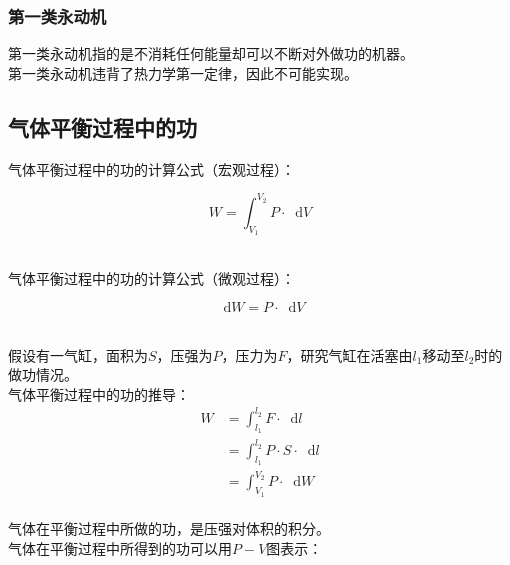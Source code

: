 \documentclass[UTF8]{ctexart}
\newcommand*{\dif}{\mathop{}\!\mathrm{d}}
\begin{document}
\subsubsection{第一类永动机}
    第一类永动机指的是不消耗任何能量却可以不断对外做功的机器。\\[3mm]
    第一类永动机违背了热力学第一定律，因此不可能实现。

\newpage

\subsection{气体平衡过程中的功}
    \setcounter{equation}{0}
    气体平衡过程中的功的计算公式（宏观过程）：
    \begin{large}
        \begin{equation*}
            W=\int_{V_1}^{V_2}P\cdot\dif V
        \end{equation*}
    \end{large}\\
    气体平衡过程中的功的计算公式（微观过程）：
    \begin{large}
        \begin{equation*}
            \dif W=P\cdot\dif V
        \end{equation*}
    \end{large}\\
    假设有一气缸，面积为$S$，压强为$P$，压力为$F$，研究气缸在活塞由$l_1$移动至$l_2$时的做功情况。\\[3mm]
    气体平衡过程中的功的推导：
    \begin{align}
        W
        &=\int_{l_1}^{l_2}F\cdot\dif l\\[3mm]
        &=\int_{l_1}^{l_2}P\cdot S\cdot\dif l\\[3mm]
        &=\int_{V_1}^{V_2}P\cdot\dif W
    \end{align}\\
    气体在平衡过程中所做的功，是压强对体积的积分。\\[3mm]
    气体在平衡过程中所得到的功可以用$P-V$图表示：\vspace{5pt}
\end{document}
